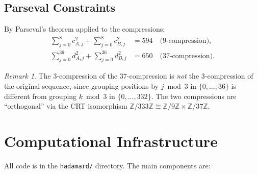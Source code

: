 \documentclass[11pt,a4paper]{article}
\newcommand{\Z}{\mathbb{Z}}
\theoremstyle{plain}
\theoremstyle{definition}
\theoremstyle{remark}
\newtheorem{remark}[theorem]{Remark}
\begin{document}
\subsection{Parseval Constraints}
By Parseval's theorem applied to the compressions:
\begin{align}
\sum_{j=0}^{8} c_{A,j}^2 + \sum_{j=0}^{8} c_{B,j}^2 &= 594 \quad\text{(9-compression)},\\[3pt]
\sum_{j=0}^{36} d_{A,j}^2 + \sum_{j=0}^{36} d_{B,j}^2 &= 650 \quad\text{(37-compression)}.
\end{align}

\begin{remark}
The $3$-compression of the $37$-compression is \emph{not} the $3$-compression of the original sequence, since grouping positions by $j\bmod3$ in $\{0,\dots,36\}$ is different from grouping $k\bmod3$ in $\{0,\dots,332\}$. The two compressions are ``orthogonal'' via the CRT isomorphism $\Z/333\Z\cong\Z/9\Z\times\Z/37\Z$.
\end{remark}

\section{Computational Infrastructure}

All code is in the \texttt{hadamard/} directory. The main components are:
\end{document}
